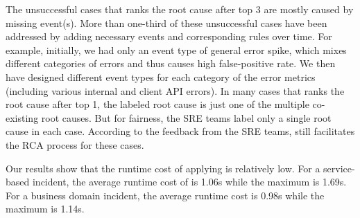 The unsuccessful cases that \system ranks the root cause after top 3 are mostly caused by missing event(s). %
More than one-third of these unsuccessful cases have been addressed by adding necessary events and corresponding rules over time. For example, initially, we had only an event type of general error spike, which mixes different categories of errors and thus causes high false-positive rate. We then have designed different event types for each category of the error metrics (including various internal and client API errors). %
In many cases that \system ranks the root cause after top 1, the labeled root cause is just one of the multiple co-existing root causes. But for fairness,  the SRE teams label only a single root cause in each case. According to the feedback from the SRE teams, \system still facilitates the RCA process for these cases.   %

Our results show that the runtime cost of applying \system is relatively low. For a service-based incident, the average runtime cost of \system is 1.06s while the maximum is 1.69s. For a business domain incident, the average runtime cost is 0.98s while the maximum is 1.14s. %


